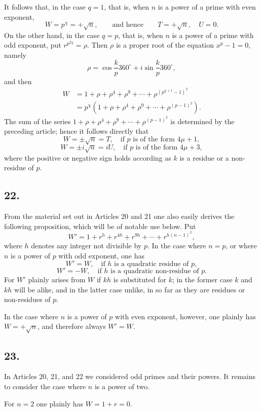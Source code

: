\documentclass[12pt]{article}
\begin{document}
It follows that, in the case $q=1$, that is, when $n$ is a power of a prime with even exponent,
\[
W=p^\chi=+\sqrt n,\qquad\text{and hence}\qquad T=+\sqrt n,\quad U=0.
\]
On the other hand, in the case $q=p$, that is, when $n$ is a power of a prime with odd exponent, put $r^{p^{2\chi}}=\rho$. Then $\rho$ is a proper root of the equation $x^p-1=0$, namely
\[
\rho=\cos\frac{k}{p}360^\circ+i\sin\frac{k}{p}360^\circ,
\]
and then
\[
\begin{aligned}
W&=1+\rho+\rho^4+\rho^9+\cdots+\rho^{(p^{\chi+1}-1)^2}\\
&=p^\chi(1+\rho+\rho^4+\rho^9+\cdots+\rho^{(p-1)^2}).
\end{aligned}
\]
The sum of the series $1+\rho+\rho^4+\rho^9+\cdots+\rho^{(p-1)^2}$ is determined by the preceding article; hence it follows directly that
\[
W=\pm\sqrt n=T,\quad\text{if }p\text{ is of the form }4\mu+1,
\]
\[
W=\pm i\sqrt n=iU,\quad\text{if }p\text{ is of the form }4\mu+3,
\]
where the positive or negative sign holds according as $k$ is a residue or a non-residue of $p$.

\subsection*{22.}

From the material set out in Articles 20 and 21 one also easily derives the following proposition, which will be of notable use below. Put
\[
W'=1+r^h+r^{4h}+r^{9h}+\cdots+r^{h(n-1)^2},
\]
where $h$ denotes any integer not divisible by $p$. In the case where $n=p$, or where $n$ is a power of $p$ with odd exponent, one has
\[
W'=W,\quad\text{if }h\text{ is a quadratic residue of }p,
\]
\[
W'=-W,\quad\text{if }h\text{ is a quadratic non-residue of }p.
\]
For $W'$ plainly arises from $W$ if $kh$ is substituted for $k$; in the former case $k$ and $kh$ will be alike, and in the latter case unlike, in so far as they are residues or non-residues of $p$.

In the case where $n$ is a power of $p$ with even exponent, however, one plainly has $W=+\sqrt n$, and therefore always $W'=W$.

\subsection*{23.}

In Articles 20, 21, and 22 we considered odd primes and their powers. It remains to consider the case where $n$ is a power of two.

For $n=2$ one plainly has $W=1+r=0$.
\end{document}
